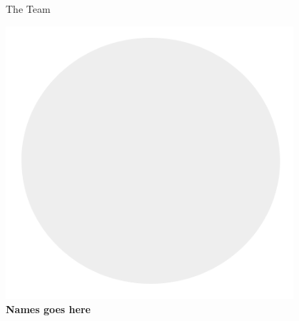 \documentclass{beamer}
\begin{document}
\begin{frame}[t]{The Team}
\begin{minipage}{0.3\linewidth}
	\end{minipage}
	\hfill
	\begin{minipage}{0.3\linewidth}
		\begin{center}
			\includegraphics[width=0.8\textwidth]{show-team/avatar-placeholder.png}\\
		\textbf{Names goes here}
		\end{center}
	\end{minipage} \\
  \end{frame}
\end{document}
